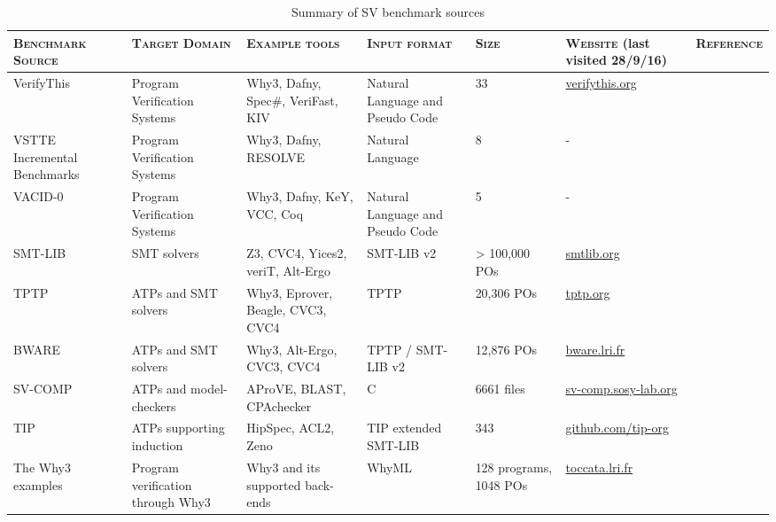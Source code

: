 \begin{table}
	\caption[Summary of SV benchmark sources]{Summary of SV benchmark sources}
	\begin{adjustbox}{angle=90}  
	\begin{tabularx}{0.9\textheight}{@{}Y|Y|Y|Y|Y|Y|c@{}}
		\textsc{\textbf{Benchmark Source}} & \textsc{\textbf{Target Domain}} &  \textsc{\textbf{Example tools}} & \textsc{\textbf{Input format}} & \textsc{\textbf{Size}} & \textsc{\textbf{Website}} \linebreak \small{(last visited 28/9/16)} & \textsc{\textbf{Reference}} \\
		\midrule
		VerifyThis & Program Verification Systems & \textsf{Why3}, Dafny, Spec\#, VeriFast, KIV & Natural Language and Pseudo Code & 33 & \href{http://www.verifythis.org/challenge-db}{verifythis.org} & \cite{Huisman2015} \\ 
		\midrule
		VSTTE Incremental Benchmarks & Program Verification Systems & \textsf{Why3}, Dafny, RESOLVE & Natural Language & 8 & - & \cite{Weide2008} \\ 
		\midrule
		VACID-0 & Program Verification Systems & \textsf{Why3}, Dafny, KeY, VCC, Coq & Natural Language and Pseudo Code & 5 & - & \cite{Leino10vacid-0:verification} \\
		\midrule
		SMT-LIB & SMT solvers & Z3, CVC4, Yices2, veriT, Alt-Ergo & SMT-LIB v2 & > 100,000 POs & \href{http://smtlib.cs.uiowa.edu/benchmarks.shtml}{smtlib.org} & \cite{BarFT-SMTLIB} \\
		\midrule
		TPTP & ATPs and SMT solvers & \textsf{Why3}, Eprover, Beagle, CVC3, CVC4 & TPTP & 20,306 POs & \href{http://www.cs.miami.edu/~tptp}{tptp.org} & \cite{SS98} \\
		\midrule
		BWARE & ATPs and SMT solvers & \textsf{Why3}, Alt-Ergo, CVC3, CVC4 & TPTP / SMT-LIB v2 & 12,876 POs & \href{http://bware.lri.fr/index.php/Benchmarks}{bware.lri.fr} & \cite{Delahaye2014} \\
		\midrule
		SV-COMP & ATPs and model-checkers & AProVE, BLAST, CPAchecker & C & 6661 files & \href{http://sv-comp.sosy-lab.org}{sv-comp.sosy-lab.org} & \cite{SVCOMP} \\   
		\midrule
		TIP & ATPs supporting induction & HipSpec, ACL2, Zeno & TIP extended SMT-LIB & 343 & \href{https://github.com/tip-org/}{github.com/tip-org} & \cite{Claessen2015} \\  
		\midrule
		The \textsf{Why3} examples & Program verification through \textsf{Why3} & \textsf{Why3} and its supported back-ends & WhyML & 128 programs, 1048 POs & \href{http://tocatta.lri.fr/gallery/why3.en.html}{toccata.lri.fr} & \cite{verifythis, tafat:inria-00636083} \\
		
	\end{tabularx}
	\end{adjustbox}
	\label{table:benchmarks}
\end{table}


